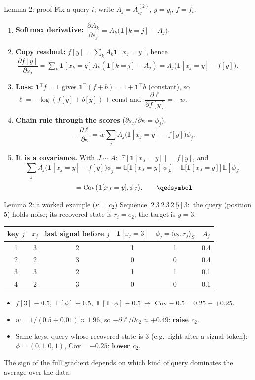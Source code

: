 \documentclass[aspectratio=169,11pt]{beamer}
\newcommand{\1}{\mathbf{1}}
\begin{document}
\begin{frame}{Lemma 2: proof}
\footnotesize\setlength{\abovedisplayskip}{3pt}\setlength{\belowdisplayskip}{3pt}
Fix a query $i$; write $A_j=A^{(2)}_{ij}$, $y=y_i$, $f=f_i$.
\begin{enumerate}
\item \textbf{Softmax derivative:} $\ \dfrac{\partial A_k}{\partial s_j}=A_k\big(\1[k=j]-A_j\big)$.
\item \textbf{Copy readout:} $f[y]=\sum_kA_k\1[x_k=y]$, hence
$\ \dfrac{\partial f[y]}{\partial s_j}=\sum_k\1[x_k=y]A_k(\1[k=j]-A_j)=A_j\big(\1[x_j=y]-f[y]\big)$.
\item \textbf{Loss:} $\1^\top f=1$ gives $\1^\top(f+b)=1+\1^\top b$ (constant), so
$\ \ell=-\log(f[y]+b[y])+\text{const}$ and $\ \dfrac{\partial\ell}{\partial f[y]}=-w$.
\item \textbf{Chain rule through the scores} ($\partial s_j/\partial\kappa=\phi_j$):
\[
-\frac{\partial\ell}{\partial\kappa}=w\sum_jA_j\big(\1[x_j=y]-f[y]\big)\phi_j .
\]
\item \textbf{It is a covariance.} With $J\sim A$: $\ \mathbb E[\1[x_J=y]]=f[y]$, and
\[
\sum_jA_j\big(\1[x_j=y]-f[y]\big)\phi_j=\mathbb E\big[\1[x_J=y]\,\phi_J\big]-\mathbb E\big[\1[x_J=y]\big]\,\mathbb E[\phi_J]
\]
\[
=\mathrm{Cov}\big(\1[x_J=y],\phi_J\big).\qquad\qedsymbol
\]
\end{enumerate}
\end{frame}

\begin{frame}{Lemma 2: a worked example ($\kappa=c_2$)}
\small
Sequence $\ 2\ 3\ 2\ 3\ 2\ \underline{5}\ |\ 3$:\ the query (position 5) holds noise; its recovered state is $r_i=e_2$; the target is $y=3$.
\begin{center}
\begin{tabular}{cccccc}\toprule
key $j$ & $x_j$ & last signal before $j$ & $\1[x_j=3]$ & $\phi_j=\langle e_2,r_j\rangle_S$ & $A_j$\\\midrule
1 & 3 & 2 & 1 & 1 & 0.4\\
2 & 2 & 3 & 0 & 0 & 0.4\\
3 & 3 & 2 & 1 & 1 & 0.1\\
4 & 2 & 3 & 0 & 0 & 0.1\\\bottomrule
\end{tabular}
\end{center}
\begin{itemize}
\item $f[3]=0.5$, $\ \mathbb E[\phi]=0.5$, $\ \mathbb E[\1\cdot\phi]=0.5\ \Rightarrow\ \mathrm{Cov}=0.5-0.25=+0.25$.
\item $w=1/(0.5+0.01)\approx1.96$, so $-\partial\ell/\partial c_2\approx+0.49$: \textbf{raise $c_2$}.
\item Same keys, query whose recovered state is $3$ (e.g.\ right after a signal token): $\phi=(0,1,0,1)$,
$\mathrm{Cov}=-0.25$: \textbf{lower $c_2$}.
\end{itemize}
\vspace{0.2em}
The sign of the full gradient depends on which kind of query dominates the average over the data.
\end{frame}
\end{document}
